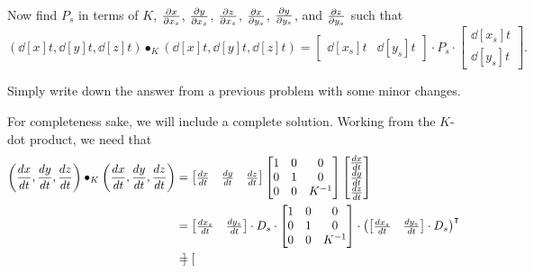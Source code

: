 \documentclass[newpage,hints,handout]{ximera}
\begin{document}
\begin{problem}
  Now find $P_s$ in terms of $K$, $\pp[x]{x_s}$, $\pp[y]{x_s}$,
  $\pp[z]{x_s}$, $\pp[x]{y_s}$, $\pp[y]{y_s}$, and $\pp[z]{y_s}$ such
  that
  \[
  \left(\dd[x]{t}, \dd[y]{t}, \dd[z]{t}\right)\bullet_K
  \left(\dd[x]{t}, \dd[y]{t}, \dd[z]{t}\right)
  =
  \begin{bmatrix}
    \dd[x_s]{t} &  \dd[y_s]{t}
  \end{bmatrix}
  \cdot P_s
  \cdot
  \begin{bmatrix}
    \dd[x_s]{t} \\  \dd[y_s]{t}
  \end{bmatrix}.
  \]
  \begin{hint}
  Simply write down the answer from a previous problem with some minor
  changes.
  \end{hint}
  \begin{freeResponse}
    For completeness sake, we will include a complete solution.
    Working from the $K$-dot product, we need that
    \begin{align*}
    \left(\dd[x]{t}, \dd[y]{t}, \dd[z]{t}\right)\bullet_K
    \left(\dd[x]{t}, \dd[y]{t}, \dd[z]{t}\right)
    &=
    \begin{bmatrix}
      \dd[x]{t} & \dd[y]{t} & \dd[z]{t}
    \end{bmatrix}
    \begin{bmatrix}
      1 & 0 & 0\\
      0 & 1 & 0\\
      0 & 0 & K^{-1}
    \end{bmatrix}
    \begin{bmatrix}
      \dd[x]{t} \\ \dd[y]{t} \\ \dd[z]{t}
    \end{bmatrix}\\
    &=
    \begin{bmatrix}
      \frac{dx_s}{dt} & \frac{dy_s}{dt}
    \end{bmatrix}\cdot D_{s}\cdot
    \begin{bmatrix}
      1 & 0 & 0\\
      0 & 1 & 0\\
    0 & 0 & K^{-1}
    \end{bmatrix}
    \cdot
    \left(
    \begin{bmatrix}
      \frac{dx_s}{dt} & \frac{dy_s}{dt}
    \end{bmatrix}\cdot D_{s}
    \right)^\transpose\\
    &=
    \begin{bmatrix}

\end{bmatrix}
\end{align*}
\end{freeResponse}
\end{problem}
\end{document}
